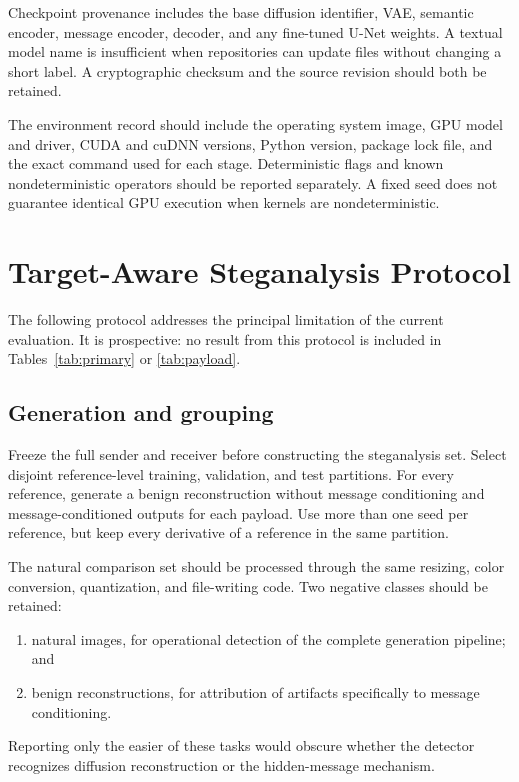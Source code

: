 \documentclass[pdflatex,sn-mathphys-num]{sn-jnl}
\begin{document}
\begin{appendices}
Checkpoint provenance includes the base diffusion identifier, VAE, semantic encoder, message encoder, decoder, and any fine-tuned U-Net weights. A textual model name is insufficient when repositories can update files without changing a short label. A cryptographic checksum and the source revision should both be retained.

The environment record should include the operating system image, GPU model and driver, CUDA and cuDNN versions, Python version, package lock file, and the exact command used for each stage. Deterministic flags and known nondeterministic operators should be reported separately. A fixed seed does not guarantee identical GPU execution when kernels are nondeterministic.

\clearpage
\section{Target-Aware Steganalysis Protocol}
\label{app:adaptive_protocol}

The following protocol addresses the principal limitation of the current evaluation. It is prospective: no result from this protocol is included in Tables~\ref{tab:primary} or \ref{tab:payload}.

\subsection{Generation and grouping}

Freeze the full sender and receiver before constructing the steganalysis set. Select disjoint reference-level training, validation, and test partitions. For every reference, generate a benign reconstruction without message conditioning and message-conditioned outputs for each payload. Use more than one seed per reference, but keep every derivative of a reference in the same partition.

The natural comparison set should be processed through the same resizing, color conversion, quantization, and file-writing code. Two negative classes should be retained:
\begin{enumerate}
\item natural images, for operational detection of the complete generation pipeline; and
\item benign reconstructions, for attribution of artifacts specifically to message conditioning.
\end{enumerate}
Reporting only the easier of these tasks would obscure whether the detector recognizes diffusion reconstruction or the hidden-message mechanism.


\end{appendices}
\end{document}

